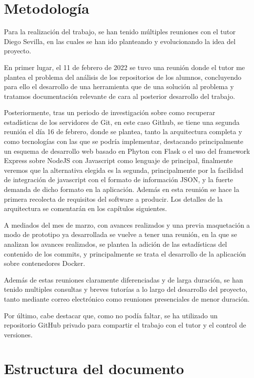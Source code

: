   
\section{Metodología}

Para la realización del trabajo, se han tenido múltiples reuniones con el tutor Diego Sevilla, en las cuales se han ido planteando y evolucionando la idea del proyecto.

En primer lugar, el 11 de febrero de 2022 se tuvo una reunión donde el tutor me plantea el problema del análisis de los repositorios de los alumnos, concluyendo para ello el desarrollo de una herramienta que de una solución al problema y tratamos documentación relevante de cara al posterior desarrollo del trabajo.

Posteriormente, tras un periodo de investigación sobre como recuperar estadísticas de los servidores de Git, en este caso Github, se tiene una segunda reunión el día 16 de febrero, donde se plantea, tanto la arquitectura completa y como tecnologías con las que se podría implementar, destacando principalmente un esquema de desarrollo web basado en Phyton con Flask o el uso del framework Express sobre NodeJS con Javascript como lenguaje de principal, finalmente veremos que la alternativa elegida es la segunda, principalmente por la facilidad de integración de javascript con el formato de información JSON, y la fuerte demanda de dicho formato en la aplicación. Además en esta reunión se hace la primera recolecta de requisitos del software a producir. Los detalles de la arquitectura se comentarán en los capítulos siguientes. 

A mediados del mes de marzo, con avances realizados y una previa maquetación a modo de prototipo ya desarrollada se vuelve a tener una reunión, en la que se analizan los avances realizados, se plantea la adición de las estadísticas del contenido de los commits, y principalmente se trata el desarrollo de la aplicación sobre contenedores Docker.

Además de estas reuniones claramente diferenciadas y de larga duración, se han tenido multiples consultas y breves tutorías a lo largo del desarrollo del proyecto, tanto mediante correo electrónico como reuniones presenciales de menor duración.

Por último, cabe destacar que, como no podía faltar, se ha utilizado un repositorio GitHub privado para compartir el trabajo con el tutor y el control de versiones.

\section{Estructura del documento}

